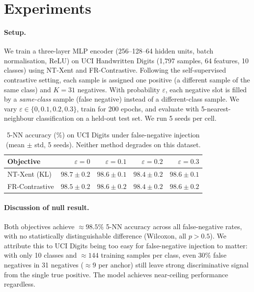 \documentclass[11pt]{article}
\begin{document}
\section{Experiments}
\label{sec:experiments}

\paragraph{Setup.}
We train a three-layer MLP encoder (256--128--64 hidden units, batch normalisation, ReLU)
on UCI Handwritten Digits (1,797 samples, 64 features, 10 classes) using NT-Xent and
FR-Contrastive. Following the self-supervised contrastive setting, each sample is assigned
one positive (a different sample of the same class) and $K=31$ negatives. With probability
$\varepsilon$, each negative slot is filled by a \emph{same-class} sample (false negative)
instead of a different-class sample. We vary $\varepsilon \in \{0, 0.1, 0.2, 0.3\}$,
train for 200 epochs, and evaluate with 5-nearest-neighbour classification on a held-out
test set. We run 5 seeds per cell.

\begin{table}[h]
  \centering
  \caption{5-NN accuracy (\%) on UCI Digits under false-negative injection (mean $\pm$ std,
  5 seeds). Neither method degrades on this dataset.}
  \label{tab:contrastive-prelim}
  \small
  \begin{tabular}{lrrrr}
    \toprule
    Objective & $\varepsilon=0$ & $\varepsilon=0.1$ & $\varepsilon=0.2$ & $\varepsilon=0.3$ \\
    \midrule
    NT-Xent (KL)   & $98.7 \pm 0.2$ & $98.6 \pm 0.1$ & $98.4 \pm 0.2$ & $98.6 \pm 0.1$ \\
    FR-Contrastive & $98.5 \pm 0.2$ & $98.6 \pm 0.2$ & $98.4 \pm 0.2$ & $98.6 \pm 0.2$ \\
    \bottomrule
  \end{tabular}
\end{table}

\paragraph{Discussion of null result.}
Both objectives achieve $\approx 98.5$\% 5-NN accuracy across all false-negative rates,
with no statistically distinguishable difference (Wilcoxon, all $p > 0.5$). We attribute
this to UCI Digits being too easy for false-negative injection to matter: with only 10
classes and $\approx 144$ training samples per class, even 30\% false negatives in 31
negatives ($\approx 9$ per anchor) still leave strong discriminative signal from the single
true positive. The model achieves near-ceiling performance regardless.
\end{document}
